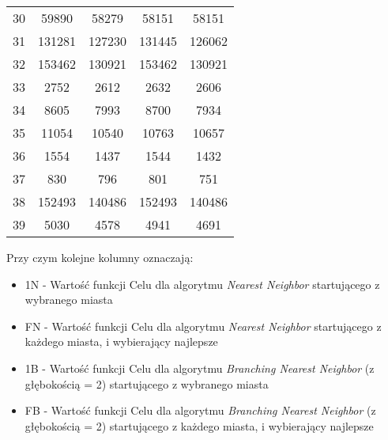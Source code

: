 \documentclass{article}
\begin{document}
\begin{table}[h!]
\begin{tabular}{c||c|c|c|c}
30 & 59890 & 58279 & 58151 & 58151 \\
31 & 131281 & 127230 & 131445 & 126062 \\
32 & 153462 & 130921 & 153462 & 130921 \\
33 & 2752 & 2612 & 2632 & 2606 \\
34 & 8605 & 7993 & 8700 & 7934 \\
35 & 11054 & 10540 & 10763 & 10657 \\
36 & 1554 & 1437 & 1544 & 1432 \\
37 & 830 & 796 & 801 & 751 \\
38 & 152493 & 140486 & 152493 & 140486 \\
39 & 5030 & 4578 & 4941 & 4691 \\

\end{tabular}
\end{table}

Przy czym kolejne kolumny oznaczają:
\begin{itemize}
	\item 1N - Wartość funkcji Celu dla algorytmu \textit{Nearest Neighbor} startującego z wybranego miasta
	\item FN - Wartość funkcji Celu dla algorytmu \textit{Nearest Neighbor} startującego z każdego miasta, i wybierający najlepsze
	\item 1B - Wartość funkcji Celu dla algorytmu \textit{Branching Nearest Neighbor} (z głębokością = 2) startującego z wybranego miasta
	\item FB - Wartość funkcji Celu dla algorytmu \textit{Branching Nearest Neighbor} (z głębokością = 2) startującego z każdego miasta, i wybierający najlepsze
\end{itemize}
\end{document}
